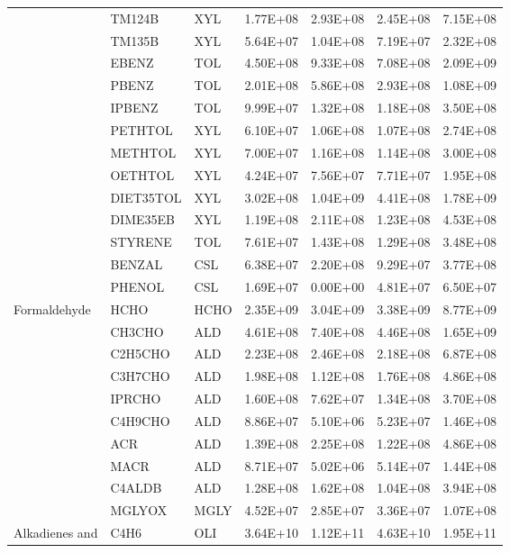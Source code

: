 \begin{longtable}{lllllll}
	 & TM124B & XYL & 1.77E+08 & 2.93E+08 & 2.45E+08 & 7.15E+08 \\
	 & TM135B & XYL & 5.64E+07 & 1.04E+08 & 7.19E+07 & 2.32E+08 \\
	\hline \parbox[t]{2mm}{} & EBENZ & TOL & 4.50E+08 & 9.33E+08 & 7.08E+08 & 2.09E+09 \\
	 & PBENZ & TOL & 2.01E+08 & 5.86E+08 & 2.93E+08 & 1.08E+09 \\
	 & IPBENZ & TOL & 9.99E+07 & 1.32E+08 & 1.18E+08 & 3.50E+08 \\
	 & PETHTOL & XYL & 6.10E+07 & 1.06E+08 & 1.07E+08 & 2.74E+08 \\
	 & METHTOL & XYL & 7.00E+07 & 1.16E+08 & 1.14E+08 & 3.00E+08 \\
	 & OETHTOL & XYL & 4.24E+07 & 7.56E+07 & 7.71E+07 & 1.95E+08 \\
	 & DIET35TOL & XYL & 3.02E+08 & 1.04E+09 & 4.41E+08 & 1.78E+09 \\
	 & DIME35EB & XYL & 1.19E+08 & 2.11E+08 & 1.23E+08 & 4.53E+08 \\
	 & STYRENE & TOL & 7.61E+07 & 1.43E+08 & 1.29E+08 & 3.48E+08 \\
	 & BENZAL & CSL & 6.38E+07 & 2.20E+08 & 9.29E+07 & 3.77E+08 \\
	 & PHENOL & CSL & 1.69E+07 & 0.00E+00 & 4.81E+07 & 6.50E+07 \\
	\hline Formaldehyde & HCHO & HCHO & 2.35E+09 & 3.04E+09 & 3.38E+09 & 8.77E+09 \\ \hline
	\parbox[t]{2mm}{} & CH3CHO & ALD & 4.61E+08 & 7.40E+08 & 4.46E+08 & 1.65E+09 \\
	 & C2H5CHO & ALD & 2.23E+08 & 2.46E+08 & 2.18E+08 & 6.87E+08 \\
	 & C3H7CHO & ALD & 1.98E+08 & 1.12E+08 & 1.76E+08 & 4.86E+08 \\
	 & IPRCHO & ALD & 1.60E+08 & 7.62E+07 & 1.34E+08 & 3.70E+08 \\
	 & C4H9CHO & ALD & 8.86E+07 & 5.10E+06 & 5.23E+07 & 1.46E+08 \\
	 & ACR & ALD & 1.39E+08 & 2.25E+08 & 1.22E+08 & 4.86E+08 \\
	 & MACR & ALD & 8.71E+07 & 5.02E+06 & 5.14E+07 & 1.44E+08 \\
	 & C4ALDB & ALD & 1.28E+08 & 1.62E+08 & 1.04E+08 & 3.94E+08 \\
	 & MGLYOX & MGLY & 4.52E+07 & 2.85E+07 & 3.36E+07 & 1.07E+08 \\
	\hline Alkadienes and & C4H6 & OLI & 3.64E+10 & 1.12E+11 & 4.63E+10 & 1.95E+11 \\

\end{longtable}
